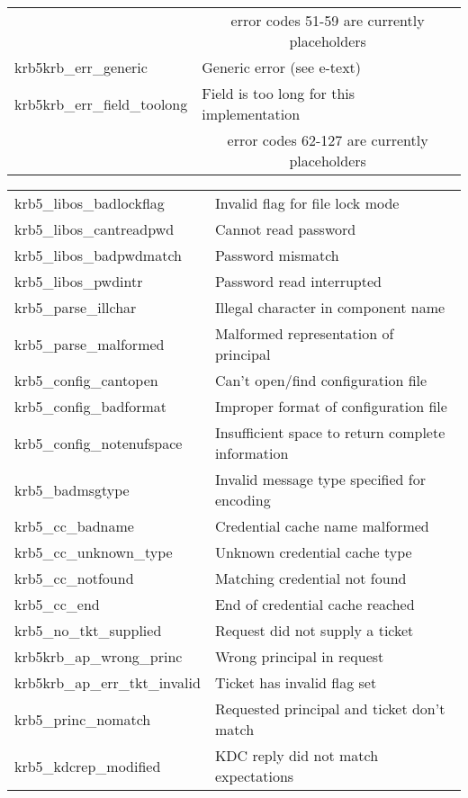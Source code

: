 \begin{small}
\begin{tabular}{ll}
 & \multicolumn{1}{c}{error codes 51-59 are currently placeholders} \\

{\sc krb5krb_err_generic }& Generic error (see e-text) \\
{\sc krb5krb_err_field_toolong }& Field is too long for this implementation \\

& \multicolumn{1}{c}{error codes 62-127 are currently placeholders} \\
\end{tabular}

\begin{tabular}{ll}
{\sc krb5_libos_badlockflag }& Invalid flag for file lock mode \\
{\sc krb5_libos_cantreadpwd }& Cannot read password \\
{\sc krb5_libos_badpwdmatch }& Password mismatch \\
{\sc krb5_libos_pwdintr }&	 Password read interrupted \\
{\sc krb5_parse_illchar }&	 Illegal character in component name \\
{\sc krb5_parse_malformed }& Malformed representation of principal \\
{\sc krb5_config_cantopen }& Can't open/find configuration file \\
{\sc krb5_config_badformat }& Improper format of configuration file \\
{\sc krb5_config_notenufspace }& Insufficient space to return complete information \\
{\sc krb5_badmsgtype }&	 Invalid message type specified for encoding \\
{\sc krb5_cc_badname }&	 Credential cache name malformed \\
{\sc krb5_cc_unknown_type }& Unknown credential cache type  \\
{\sc krb5_cc_notfound }&	 Matching credential not found \\
{\sc krb5_cc_end }&		 End of credential cache reached \\
{\sc krb5_no_tkt_supplied }& Request did not supply a ticket \\
{\sc krb5krb_ap_wrong_princ }&	 Wrong principal in request \\
{\sc krb5krb_ap_err_tkt_invalid }& Ticket has invalid flag set \\
{\sc krb5_princ_nomatch }&	 Requested principal and ticket don't match \\
{\sc krb5_kdcrep_modified }& KDC reply did not match expectations \\

\end{tabular}
\end{small}
